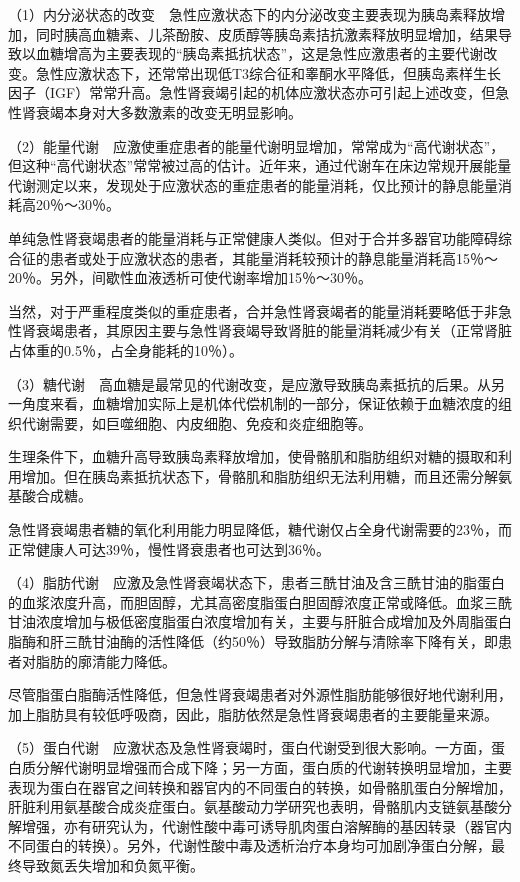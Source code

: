（1）内分泌状态的改变　急性应激状态下的内分泌改变主要表现为胰岛素释放增加，同时胰高血糖素、儿茶酚胺、皮质醇等胰岛素拮抗激素释放明显增加，结果导致以血糖增高为主要表现的“胰岛素抵抗状态”，这是急性应激患者的主要代谢改变。急性应激状态下，还常常出现低T3综合征和睾酮水平降低，但胰岛素样生长因子（IGF）常常升高。急性肾衰竭引起的机体应激状态亦可引起上述改变，但急性肾衰竭本身对大多数激素的改变无明显影响。

（2）能量代谢　应激使重症患者的能量代谢明显增加，常常成为“高代谢状态”，但这种“高代谢状态”常常被过高的估计。近年来，通过代谢车在床边常规开展能量代谢测定以来，发现处于应激状态的重症患者的能量消耗，仅比预计的静息能量消耗高20％～30％。

单纯急性肾衰竭患者的能量消耗与正常健康人类似。但对于合并多器官功能障碍综合征的患者或处于应激状态的患者，其能量消耗较预计的静息能量消耗高15％～20％。另外，间歇性血液透析可使代谢率增加15％～30％。

当然，对于严重程度类似的重症患者，合并急性肾衰竭者的能量消耗要略低于非急性肾衰竭患者，其原因主要与急性肾衰竭导致肾脏的能量消耗减少有关（正常肾脏占体重的0.5％，占全身能耗的10％）。

（3）糖代谢　高血糖是最常见的代谢改变，是应激导致胰岛素抵抗的后果。从另一角度来看，血糖增加实际上是机体代偿机制的一部分，保证依赖于血糖浓度的组织代谢需要，如巨噬细胞、内皮细胞、免疫和炎症细胞等。

生理条件下，血糖升高导致胰岛素释放增加，使骨骼肌和脂肪组织对糖的摄取和利用增加。但在胰岛素抵抗状态下，骨骼肌和脂肪组织无法利用糖，而且还需分解氨基酸合成糖。

急性肾衰竭患者糖的氧化利用能力明显降低，糖代谢仅占全身代谢需要的23％，而正常健康人可达39％，慢性肾衰患者也可达到36％。

（4）脂肪代谢　应激及急性肾衰竭状态下，患者三酰甘油及含三酰甘油的脂蛋白的血浆浓度升高，而胆固醇，尤其高密度脂蛋白胆固醇浓度正常或降低。血浆三酰甘油浓度增加与极低密度脂蛋白浓度增加有关，主要与肝脏合成增加及外周脂蛋白脂酶和肝三酰甘油酶的活性降低（约50％）导致脂肪分解与清除率下降有关，即患者对脂肪的廓清能力降低。

尽管脂蛋白脂酶活性降低，但急性肾衰竭患者对外源性脂肪能够很好地代谢利用，加上脂肪具有较低呼吸商，因此，脂肪依然是急性肾衰竭患者的主要能量来源。

（5）蛋白代谢　应激状态及急性肾衰竭时，蛋白代谢受到很大影响。一方面，蛋白质分解代谢明显增强而合成下降；另一方面，蛋白质的代谢转换明显增加，主要表现为蛋白在器官之间转换和器官内的不同蛋白的转换，如骨骼肌蛋白分解增加，肝脏利用氨基酸合成炎症蛋白。氨基酸动力学研究也表明，骨骼肌内支链氨基酸分解增强，亦有研究认为，代谢性酸中毒可诱导肌肉蛋白溶解酶的基因转录（器官内不同蛋白的转换）。另外，代谢性酸中毒及透析治疗本身均可加剧净蛋白分解，最终导致氮丢失增加和负氮平衡。

